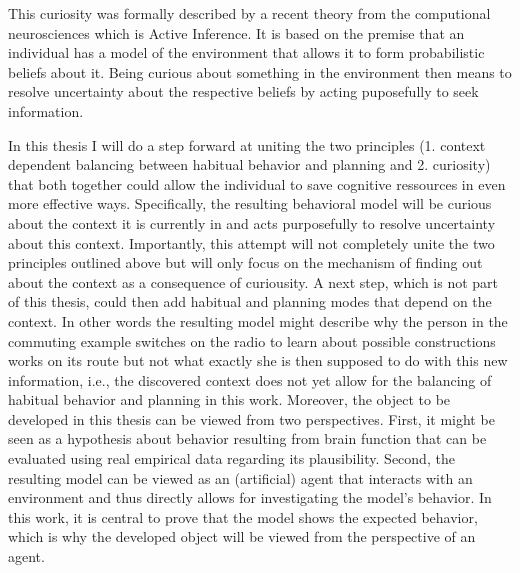 This curiosity was formally described by a recent theory from the computional neurosciences which is Active Inference. It is based on the premise that an individual has a model of the environment that allows it to form probabilistic beliefs about it. Being curious about something in the environment then means to resolve uncertainty about the respective beliefs by acting puposefully to seek information.

In this thesis I will do a step forward at uniting the two principles (1. context dependent balancing between habitual behavior and planning and 2. curiosity) that both together could allow the individual to save cognitive ressources in even more effective ways. Specifically, the resulting behavioral model will be curious about the context it is currently in and acts purposefully to resolve uncertainty about this context. Importantly, this attempt will not completely unite the two principles outlined above but will only focus on the mechanism of finding out about the context as a consequence of curiousity. A next step, which is not part of this thesis, could then add habitual and planning modes that depend on the context. In other words the resulting model might describe why the person in the commuting example switches on the radio to learn about possible constructions works on its route but not what exactly she is then supposed to do with this new information, i.e., the discovered context does not yet allow for the balancing of habitual behavior and planning in this work. Moreover, the object to be developed in this thesis can be viewed from two perspectives. First, it might be seen as a hypothesis about behavior resulting from brain function that can be evaluated using real empirical data regarding its plausibility. Second, the resulting model can be viewed as an (artificial) agent that interacts with an environment and thus directly allows for investigating the model's behavior. In this work, it is central to prove that the model shows the expected behavior, which is why the developed object will be viewed from the perspective of an agent.

